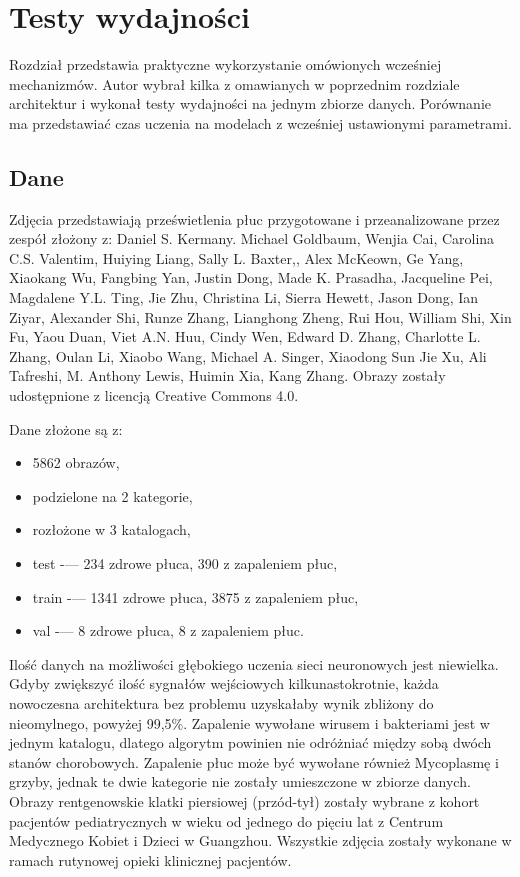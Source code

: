 \documentclass[12pt,a4paper,twoside,titlepage,openright]{book}
\begin{document}
\chapter{Testy wydajności}
Rozdział przedstawia praktyczne wykorzystanie omówionych wcześniej mechanizmów. Autor wybrał kilka z omawianych w poprzednim rozdziale architektur i wykonał testy wydajności na jednym zbiorze danych. Porównanie ma przedstawiać czas uczenia na modelach z wcześniej ustawionymi parametrami.

\section{Dane}
Zdjęcia przedstawiają prześwietlenia płuc przygotowane i przeanalizowane przez zespół złożony z: Daniel S. Kermany. Michael Goldbaum, Wenjia Cai, Carolina C.S. Valentim, Huiying Liang, Sally L. Baxter,, Alex McKeown, Ge Yang, Xiaokang Wu, Fangbing Yan, Justin Dong, Made K. Prasadha, Jacqueline Pei, Magdalene Y.L. Ting, Jie Zhu, Christina Li, Sierra Hewett, Jason Dong, Ian Ziyar, Alexander Shi, Runze Zhang, Lianghong Zheng, Rui Hou, William Shi, Xin Fu, Yaou Duan, Viet A.N. Huu, Cindy Wen, Edward D. Zhang, Charlotte L. Zhang, Oulan Li, Xiaobo Wang, Michael A. Singer, Xiaodong Sun Jie Xu, Ali Tafreshi, M. Anthony Lewis, Huimin Xia, Kang Zhang. Obrazy zostały udostępnione z licencją Creative Commons 4.0.\cite{siteCell}

Dane złożone są z:
\begin{itemize}
\item 5862 obrazów,
\item podzielone na 2 kategorie,
\item rozłożone w 3 katalogach,
\item test -— 234 zdrowe płuca, 390 z zapaleniem płuc,
\item train -— 1341 zdrowe płuca, 3875 z zapaleniem płuc,
\item val -— 8 zdrowe płuca, 8 z zapaleniem płuc.
\end{itemize}

Ilość danych na możliwości głębokiego uczenia sieci neuronowych jest niewielka. Gdyby zwiększyć ilość sygnałów wejściowych kilkunastokrotnie, każda nowoczesna architektura bez problemu uzyskałaby wynik zbliżony do nieomylnego, powyżej 99,5\%. Zapalenie wywołane wirusem i bakteriami jest w jednym katalogu, dlatego algorytm powinien nie odróżniać między sobą dwóch stanów chorobowych. Zapalenie płuc może być wywołane również Mycoplasmę i grzyby, jednak te dwie kategorie nie zostały umieszczone w zbiorze danych. Obrazy rentgenowskie klatki piersiowej (przód-tył) zostały wybrane z kohort pacjentów pediatrycznych w wieku od jednego do pięciu lat z Centrum Medycznego Kobiet i Dzieci w Guangzhou. Wszystkie zdjęcia zostały wykonane w ramach rutynowej opieki klinicznej pacjentów.
\end{document}
